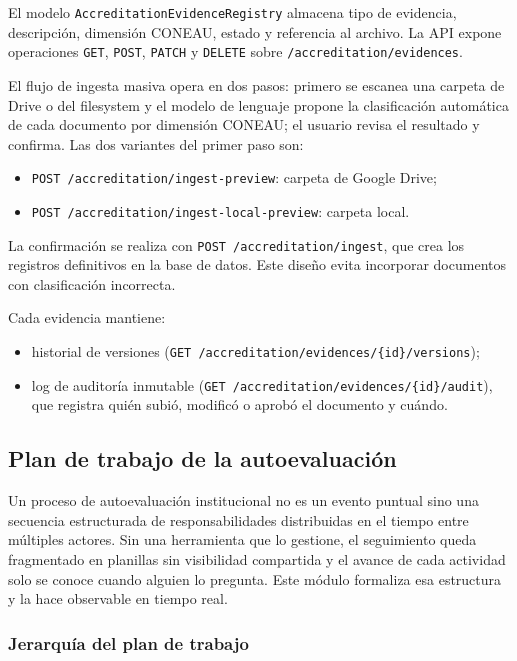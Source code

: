 El modelo \texttt{AccreditationEvidenceRegistry} almacena tipo de evidencia,
descripción, dimensión CONEAU, estado y referencia al archivo.
La API expone operaciones \texttt{GET}, \texttt{POST}, \texttt{PATCH} y
\texttt{DELETE} sobre \texttt{/accreditation/evidences}.

El flujo de ingesta masiva opera en dos pasos: primero se escanea una
carpeta de Drive o del filesystem y el modelo de lenguaje propone la
clasificación automática de cada documento por dimensión CONEAU; el usuario
revisa el resultado y confirma.
Las dos variantes del primer paso son:
\begin{itemize}[noitemsep, topsep=2pt]
  \item \texttt{POST /accreditation/ingest-preview}: carpeta de Google Drive;
  \item \texttt{POST /accreditation/ingest-local-preview}: carpeta local.
\end{itemize}
La confirmación se realiza con \texttt{POST /accreditation/ingest},
que crea los registros definitivos en la base de datos.
Este diseño evita incorporar documentos con clasificación incorrecta.

Cada evidencia mantiene:
\begin{itemize}[noitemsep, topsep=2pt]
  \item historial de versiones
    (\texttt{GET /accreditation/evidences/\{id\}/versions});
  \item log de auditoría inmutable
    (\texttt{GET /accreditation/evidences/\{id\}/audit}),
    que registra quién subió, modificó o aprobó el documento y cuándo.
\end{itemize}

\subsection{Plan de trabajo de la autoevaluación}
\label{subsec:plan_trabajo}

Un proceso de autoevaluación institucional no es un evento puntual sino
una secuencia estructurada de responsabilidades distribuidas en el tiempo
entre múltiples actores.
Sin una herramienta que lo gestione, el seguimiento queda fragmentado en
planillas sin visibilidad compartida y el avance de cada actividad solo
se conoce cuando alguien lo pregunta.
Este módulo formaliza esa estructura y la hace observable en tiempo real.

\subsubsection*{Jerarquía del plan de trabajo}

